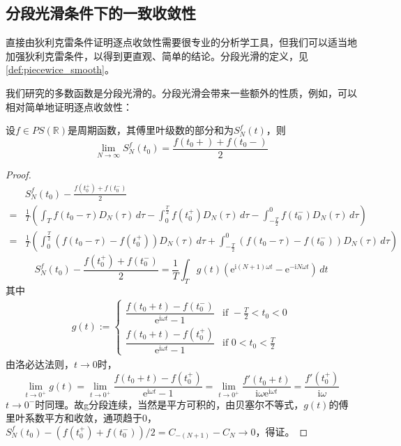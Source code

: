 \subsection{分段光滑条件下的一致收敛性}\label{sub:uniform_converge}
直接由狄利克雷条件证明逐点收敛性需要很专业的分析学工具，但我们可以适当地加强狄利克雷条件，以得到更直观、简单的结论\cite{folland}。分段光滑的定义，见\cref{def:piecewice_smooth}。

我们研究的多数函数是分段光滑的。分段光滑会带来一些额外的性质，例如，可以相对简单地证明逐点收敛性：
\begin{theorem}[傅里叶级数的逐点收敛性]
    设$f\in PS(\mathbb{R})$是周期函数，其傅里叶级数的部分和为$S_N^f(t)$，则
    \[\lim_{N\to\infty}S_N^f(t_0)=\frac{f(t_0+)+f(t_0-)}{2}\]
\end{theorem}
\begin{proof}
\begin{align*}
    &S_N^f(t_0)-\frac{f(t_0^+)+f(t_0^-)}{2} \\
    =&\frac{1}{T}\left(\int_{T}f(t_0-\tau)D_N(\tau)\,d\tau-\int_{0}^{\frac{T}{2}}f(t_0^+)D_N(\tau)\,d\tau-\int_{-\frac{T}{2}}^{0}f(t_0^-)D_N(\tau)\,d\tau\right)\\
    =&\frac{1}{T}\left(\int_{0}^{\frac{T}{2}}(f(t_0-\tau)-f(t_0^+))D_N(\tau)\,d\tau+\int_{-\frac{T}{2}}^{0}(f(t_0-\tau)-f(t_0^-))D_N(\tau)\,d\tau\right)
\end{align*}
$$S_N^f(t_0)-\frac{f(t_0^+)+f(t_0^-)}{2}=\frac{1}{T}\int_{T}g(t)\left(\mathrm{e}^{\mathrm{i}(N+1)\omega t}-\mathrm{e}^{-\mathrm{i}N\omega t}\right)\,dt$$
其中\begin{align*}
g(t):=\begin{cases}
\dfrac{f(t_0+t)-f(t_0^-)}{\mathrm{e}^{\mathrm{i}\omega t}-1} & \text{if }-\frac{T}{2}<t_0<0 \\
\dfrac{f(t_0+t)-f(t_0^+)}{\mathrm{e}^{\mathrm{i}\omega t}-1} & \text{if }0<t_0<\frac{T}{2}
\end{cases}
\end{align*}                        
由洛必达法则，$t\to 0$时，\[\lim_{t\to 0^+}g(t)=\lim_{t\to 0^+}\frac{f(t_0+t)-f(t_0^+)}{\mathrm{e}^{\mathrm{i}\omega t}-1}=\lim_{t\to 0^+}\frac{f'(t_0+t)}{\mathrm{i}\omega \mathrm{e}^{\mathrm{i}\omega t}}=\frac{f'(t_0^+)}{\mathrm{i}\omega}\]
$t\to 0^-$时同理。故g分段连续，当然是平方可积的，由贝塞尔不等式，$g(t)$的傅里叶系数平方和收敛，通项趋于0，$S_N^f(t_0)-\left(f(t_0^+)+f(t_0^-)\right)/2=C_{-(N+1)}-C_N\to 0$，得证。
\end{proof}

